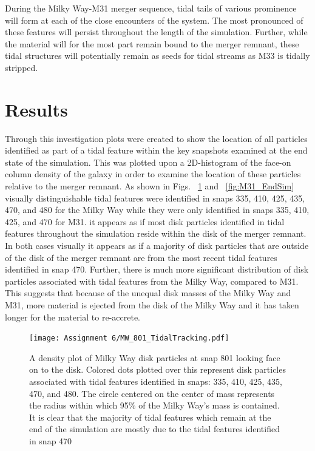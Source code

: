 \documentclass[fleqn,usenatbib]{mnras}
\begin{document}
During the Milky Way-M31 merger sequence, tidal tails of various prominence will form at each of the close encounters of the system. 
The most pronounced of these features will persist throughout the length of the simulation. 
Further, while the material will for the most part remain bound to the merger remnant, these tidal structures will potentially remain as seeds for tidal streams as M33 is tidally stripped.

\section{Results}
Through this investigation plots were created to show the location of all particles identified as part of a tidal feature within the key snapshots examined at the end state of the simulation. This was plotted upon a 2D-histogram of the face-on column density of the galaxy in order to examine the location of these particles relative to the merger remnant. As shown in Figs. ~\ref{fig:MW_EndSim} and ~\ref{fig:M31_EndSim} visually distinguishable tidal features were identified in snaps 335, 410, 425, 435, 470, and 480 for the Milky Way while they were only identified in snaps 335, 410, 425, and 470 for M31. it appears as if most disk particles identified in tidal features throughout the simulation reside within the disk of the merger remnant. In both cases visually it appears as if a majority of disk particles that are outside of the disk of the merger remnant are from the most recent tidal features identified in snap 470. Further, there is much more significant distribution of disk particles associated with tidal features from the Milky Way, compared to M31. This suggests that because of the unequal disk masses of the Milky Way and M31, more material is ejected from the disk of the Milky Way and it has taken longer for the material to re-accrete.

\begin{figure}
	\texttt{[image: Assignment 6/MW\_801\_TidalTracking.pdf]}
    \caption{A density plot of Milky Way disk particles at snap 801 looking face on to the disk. Colored dots plotted over this represent disk particles associated with tidal features identified in snaps: 335, 410, 425, 435, 470, and 480. The circle centered on the center of mass represents the radius within which 95\% of the Milky Way's mass is contained. It is clear that the majority of tidal features which remain at the end of the simulation are mostly due to the tidal features identified in snap 470}
    \label{fig:MW_EndSim}
\end{figure}
\end{document}
